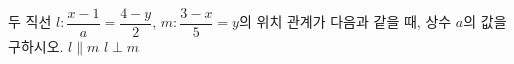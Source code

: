 두 직선 $l\colon \dfrac{x-1}{a}=\dfrac{4-y}{2}$, $m\colon \dfrac{3-x}{5}=y$의 위치 관계가 다음과 같을 때, 상수 $a$의 값을 구하시오.
 $l\parallel m$
 $l\perp m$
